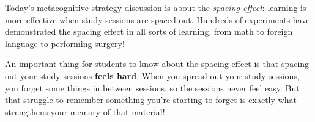 \documentclass{article}
\begin{document}

\begin{workshop}
  Today's metacognitive strategy discussion is about the \emph{spacing effect}: learning is more effective when study sessions are spaced out. Hundreds of experiments have demonstrated the spacing effect in all sorts of learning, from math to foreign language to performing surgery!

  An important thing for students to know about the spacing effect is that spacing out your study sessions \textbf{feels hard}. When you spread out your study sessions, you forget some things in between sessions, so the sessions never feel easy. But that struggle to remember something you're starting to forget is exactly what strengthens your memory of that material!
\end{workshop}
\end{document}
